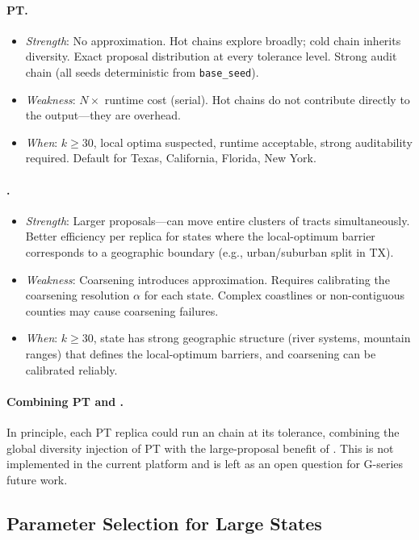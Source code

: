 \paragraph{PT.}
\begin{itemize}
\item \emph{Strength}: No approximation. Hot chains explore broadly; cold chain
  inherits diversity. Exact \fr{} proposal distribution at every tolerance level.
  Strong audit chain (all seeds deterministic from \texttt{base\_seed}).
\item \emph{Weakness}: $N\times$ runtime cost (serial). Hot chains do not
  contribute directly to the output---they are overhead.
\item \emph{When}: $k \ge 30$, local optima suspected, runtime acceptable,
  strong auditability required.
  Default for Texas, California, Florida, New York.
\end{itemize}

\paragraph{\ms{}.}
\begin{itemize}
\item \emph{Strength}: Larger proposals---can move entire clusters of tracts
  simultaneously. Better efficiency per replica for states where the
  local-optimum barrier corresponds to a geographic boundary (e.g.,
  urban/suburban split in TX).
\item \emph{Weakness}: Coarsening introduces approximation. Requires calibrating
  the coarsening resolution $\alpha$ for each state. Complex coastlines or
  non-contiguous counties may cause coarsening failures.
\item \emph{When}: $k \ge 30$, state has strong geographic structure (river
  systems, mountain ranges) that defines the local-optimum barriers,
  and coarsening can be calibrated reliably.
\end{itemize}

\paragraph{Combining PT and \ms{}.}
In principle, each PT replica could run an \ms{} chain at its tolerance,
combining the global diversity injection of PT with the large-proposal benefit
of \ms{}.
This is not implemented in the current platform and is left as an open question
for G-series future work.

\subsection{Parameter Selection for Large States}

